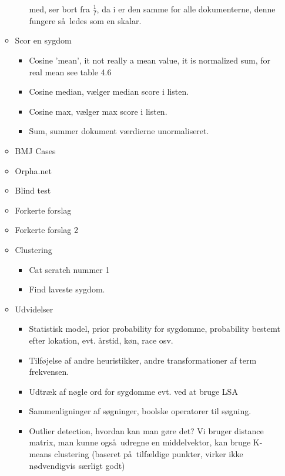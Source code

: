 \documentclass[a4paper, 10pt, english, final]{report}
\begin{document}
\begin{itemize}
\begin{itemize}
\begin{itemize}
            med, ser bort fra $\frac{1}{I}$, da i er den samme for
            alle dokumenterne, denne fungere s\aa\ ledes som en
            skalar.
        \end{itemize}
      \item Scor en sygdom
        \begin{itemize}
          \item Cosine 'mean', it not really a mean value, it is normalized sum, for real mean see table 4.6
          \item Cosine median, v\ae lger median score i listen.
          \item Cosine max, v\ae lger max score i listen.
          \item Sum, summer dokument v\ae rdierne unormaliseret.
        \end{itemize}
      \item BMJ Cases

      \item Orpha.net

      \item Blind test

      \item Forkerte forslag

      \item Forkerte forslag 2

      \item Clustering
        \begin{itemize}
          \item Cat scratch nummer 1
          \item Find laveste sygdom.            
        \end{itemize}
      \item Udvidelser
        \begin{itemize}
          \item Statistisk model, prior probability for sygdomme,
            probability bestemt efter lokation, evt. \aa rstid, k\o n,
            race osv.
          \item Tilf\o jelse af andre heuristikker, andre
            transformationer af term frekvensen.
          \item Udtr\ae k af n\o gle ord for sygdomme evt. ved at
            bruge LSA
          \item Sammenligninger af s\o gninger, boolske operatorer til
            s\o gning.
          \item Outlier detection, hvordan kan man g\o re det? Vi
            bruger distance matrix, man kunne ogs\aa\ udregne en
            middelvektor, kan bruge K-means clustering (baseret
            p\aa\ tilf\ae ldige punkter, virker ikke n\o dvendigvis
            s\ae rligt godt)
        \end{itemize}
    \end{itemize}

\end{itemize}
\end{document}

